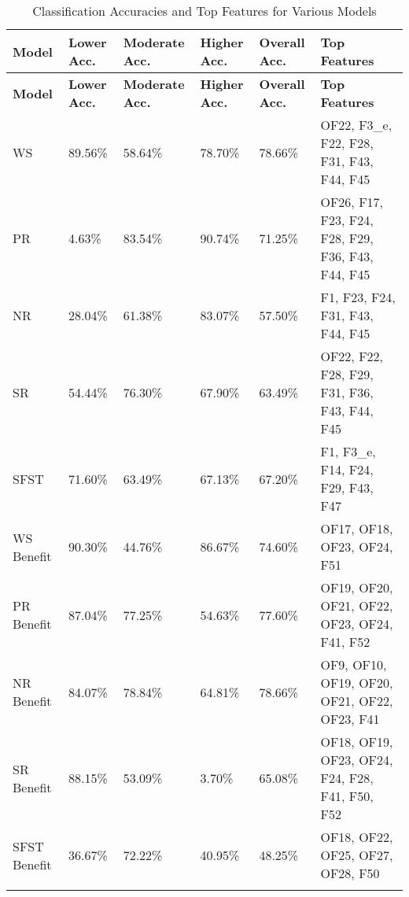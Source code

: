 \begin{longtable}{|p{2cm}|p{2cm}|p{2cm}|p{2cm}|p{2cm}|p{4cm}|}
\hline
\textbf{Model} & \textbf{Lower Acc.} & \textbf{Moderate Acc.} & \textbf{Higher Acc.} & \textbf{Overall Acc.} & \textbf{Top Features} \\ \hline
\endfirsthead
\hline
\textbf{Model} & \textbf{Lower Acc.} & \textbf{Moderate Acc.} & \textbf{Higher Acc.} & \textbf{Overall Acc.} & \textbf{Top Features} \\ \hline
\endhead

WS & 89.56\% & 58.64\% & 78.70\% & 78.66\% & OF22, F3\_e, F22, F28, F31, F43, F44, F45 \\ \hline
PR & 4.63\% & 83.54\% & 90.74\% & 71.25\% & OF26, F17, F23, F24, F28, F29, F36, F43, F44, F45 \\ \hline
NR & 28.04\% & 61.38\% & 83.07\% & 57.50\% & F1, F23, F24, F31, F43, F44, F45 \\ \hline
SR & 54.44\% & 76.30\% & 67.90\% & 63.49\% & OF22, F22, F28, F29, F31, F36, F43, F44, F45 \\ \hline
SFST & 71.60\% & 63.49\% & 67.13\% & 67.20\% & F1, F3\_e, F14, F24, F29, F43, F47 \\ \hline
WS Benefit & 90.30\% & 44.76\% & 86.67\% & 74.60\% & OF17, OF18, OF23, OF24, F51 \\ \hline
PR Benefit & 87.04\% & 77.25\% & 54.63\% & 77.60\% & OF19, OF20, OF21, OF22, OF23, OF24, F41, F52 \\ \hline
NR Benefit & 84.07\% & 78.84\% & 64.81\% & 78.66\% & OF9, OF10, OF19, OF20, OF21, OF22, OF23, F41 \\ \hline
SR Benefit & 88.15\% & 53.09\% & 3.70\% & 65.08\% & OF18, OF19, OF23, OF24, F24, F28, F41, F50, F52 \\ \hline
SFST Benefit & 36.67\% & 72.22\% & 40.95\% & 48.25\% & OF18, OF22, OF25, OF27, OF28, F50 \\ \hline
\caption{Classification Accuracies and Top Features for Various Models}
\label{tab:grouping_1c}
\end{longtable}
